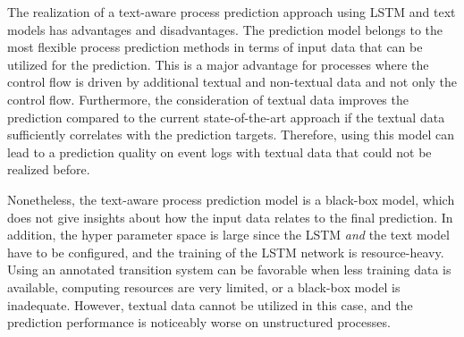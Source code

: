 The realization of a text-aware process prediction approach using LSTM and text models has advantages and disadvantages.
The prediction model belongs to the most flexible process prediction methods in terms of input data that can be utilized for the prediction.
This is a major advantage for processes where the control flow is driven by additional textual and non-textual data and not only the control flow.
Furthermore, the consideration of textual data improves the prediction compared to the current state-of-the-art approach if the textual data sufficiently correlates with the prediction targets.
Therefore, using this model can lead to a prediction quality on event logs with textual data that could not be realized before.

Nonetheless, the text-aware process prediction model is a black-box model, which does not give insights about how the input data relates to the final prediction.
In addition, the hyper parameter space is large since the LSTM \textit{and} the text model have to be configured, and the training of the LSTM network is resource-heavy.
Using an annotated transition system can be favorable when less training data is available, computing resources are very limited, or a black-box model is inadequate.
However, textual data cannot be utilized in this case, and the prediction performance is noticeably worse on unstructured processes.